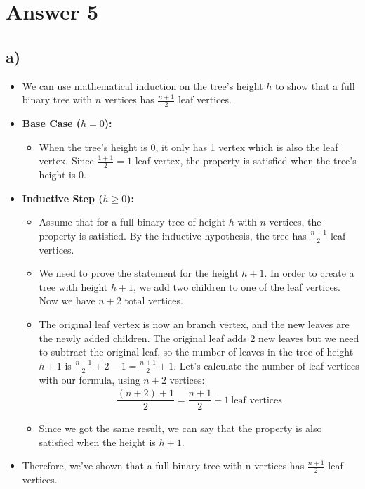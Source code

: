 \documentclass[12pt]{article}
\begin{document}
\section*{Answer 5}
\subsection*{a)}
\begin{itemize}
 \item We can use mathematical induction on the tree's height $h$ to show that a full binary tree with $n$ vertices has $\frac{n+1}{2}$ leaf vertices.
 \item \textbf{Base Case ($h = 0$):}
 \begin{itemize}
  \item When the tree's height is 0, it only has 1 vertex which is also the leaf vertex. Since $\frac{1+1}{2} = 1$ leaf vertex, the property is satisfied when the tree's height is 0.
 \end{itemize}
 \item \textbf{Inductive Step ($h \geq 0$):}
 \begin{itemize}
  \item Assume that for a full binary tree of height $h$ with $n$ vertices, the property is satisfied. By the inductive hypothesis, the tree has $\frac{n+1}{2}$ leaf vertices.
  \item We need to prove the statement for the height $h+1$. In order to create a tree with height $h+1$, we add two children to one of the leaf vertices. Now we have $n+2$ total vertices.
  \item The original leaf vertex is now an branch vertex, and the new leaves are the newly added children. The original leaf adds 2 new leaves but we need to subtract the original leaf, so the number of leaves in the tree of height $h+1$ is $\frac{n+1}{2} + 2 - 1 = \frac{n+1}{2} + 1$. Let's calculate the number of leaf vertices with our formula, using $n + 2$ vertices:
  \begin{equation*}
   \begin{split}
    \dfrac{(n+2)+1}{2} = \dfrac{n+1}{2} + 1 \ \text{leaf vertices}
   \end{split}
  \end{equation*}
  \item Since we got the same result, we can say that the property is also satisfied when the height is $h+1$.
 \end{itemize}
 \item Therefore, we've shown that a full binary tree with n vertices has $\frac{n+1}{2}$ leaf vertices.
\end{itemize}
\end{document}
